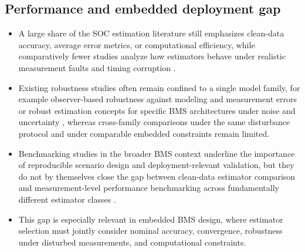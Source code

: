 \documentclass[review,nopreprintline]{elsarticle}
\begin{document}
\subsection{Performance and embedded deployment gap}
\begin{itemize}[leftmargin=*]
    \item A large share of the SOC estimation literature still emphasizes clean-data accuracy, average error metrics, or computational efficiency, while comparatively fewer studies analyze how estimators behave under realistic measurement faults and timing corruption \cite{shrivastavaReviewTechnologicalAdvancement2023,Embedded_AI_only_SOC_mobile,giazitzisCaseStudyTiny2024,mazziStateChargeEstimation2022}.
    \item Existing robustness studies often remain confined to a single model family, for example observer-based robustness against modeling and measurement errors \cite{liRobustnessSOCEstimation2015} or robust estimation concepts for specific BMS architectures under noise and uncertainty \cite{naseriReliableWirelessBMS2025}, whereas cross-family comparisons under the same disturbance protocol and under comparable embedded constraints remain limited.
    \item Benchmarking studies in the broader BMS context underline the importance of reproducible scenario design and deployment-relevant validation, but they do not by themselves close the gap between clean-data estimator comparison and measurement-level performance benchmarking across fundamentally different estimator classes \cite{bergerBenchmarkingBatteryManagement2024}.
    \item This gap is especially relevant in embedded BMS design, where estimator selection must jointly consider nominal accuracy, convergence, robustness under disturbed measurements, and computational constraints.
\end{itemize}
\end{document}
